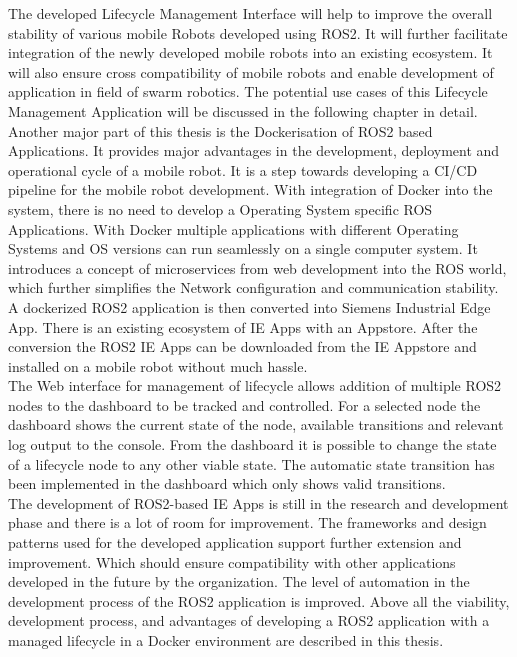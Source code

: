    The developed Lifecycle Management Interface will help to improve the overall stability of various mobile Robots developed using ROS2. It will further facilitate integration of the newly developed mobile robots into an existing ecosystem. It will also ensure cross compatibility of mobile robots and enable development of application in field of swarm robotics. The potential use cases of this Lifecycle Management Application will be discussed in the following chapter in detail.
    \\

    Another major part of this thesis is the Dockerisation of ROS2 based Applications. It provides major advantages in the development, deployment and operational cycle of a mobile robot. It is a step towards developing a CI/CD pipeline for the mobile robot development. With integration of Docker into the system, there is no need to develop a Operating System specific ROS Applications. With Docker multiple applications with different Operating Systems and OS versions can run seamlessly on a single computer system. It introduces a concept of microservices from web development into the ROS world, which further simplifies the Network configuration and communication stability. A dockerized ROS2 application is then converted into Siemens Industrial Edge App. There is an existing ecosystem of IE Apps with an Appstore. After the conversion the ROS2 IE Apps can be downloaded from the IE Appstore and installed on a mobile robot without much hassle. 
    \\
    
    The Web interface for management of lifecycle allows addition of multiple ROS2 nodes to the dashboard to be tracked and controlled. For a selected node the dashboard shows the current state of the node, available transitions and relevant log output to the console. From the dashboard it is possible to change the state of a lifecycle node to any other viable state. The automatic state transition has been implemented in the dashboard which only shows valid transitions.
    \\

    The development of ROS2-based IE Apps is still in the research and development phase and there is a lot of room for improvement. The frameworks and design patterns used for the developed application support further extension and improvement. Which should ensure compatibility with other applications developed in the future by the organization. The level of automation in the development process of the ROS2 application is improved. Above all the viability, development process, and advantages of developing a ROS2 application with a managed lifecycle in a Docker environment are described in this thesis. 